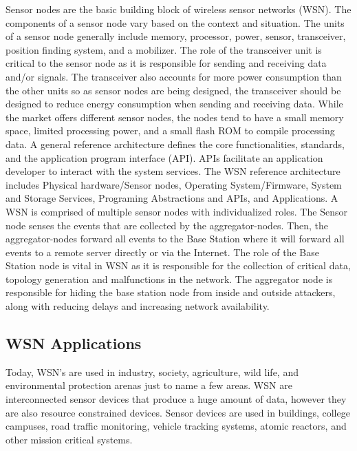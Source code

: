 Sensor nodes are the basic building block of wireless sensor networks (WSN). The components of a sensor node vary based on the context and situation. The units of a sensor node generally include memory, processor, power, sensor, transceiver, position finding system, and a mobilizer. The role of the transceiver unit is critical to the sensor node as it is responsible for sending and receiving data and/or signals. The transceiver also accounts for more power consumption than the other units so as sensor nodes are being designed, the transceiver should be designed to reduce energy consumption when sending and receiving data. While the market offers different sensor nodes, the nodes tend to have a small memory space, limited processing power, and a small flash ROM to compile processing data. A general reference architecture defines the core functionalities, standards, and the application program interface (API). APIs facilitate an application developer to interact with the system services. The WSN reference architecture includes Physical hardware/Sensor nodes, Operating System/Firmware, System and Storage Services, Programing Abstractions and APIs, and Applications. A WSN is comprised of multiple sensor nodes with individualized roles. The Sensor node senses the events that are collected by the aggregator-nodes. Then, the aggregator-nodes forward all events to the Base Station where it will forward all events to a remote server directly or via the Internet. The role of the Base Station node is vital in WSN as it is responsible for the collection of critical data, topology generation and malfunctions in the network. The aggregator node is responsible for hiding the base station node from inside and outside attackers, along with reducing delays and increasing network availability. 

\subsection {WSN Applications} 

Today, WSN’s are used in industry, society, agriculture, wild life, and environmental protection arenas just to name a few areas. WSN are interconnected sensor devices that produce a huge amount of data, however they are also resource constrained devices. Sensor devices are used in buildings, college campuses, road traffic monitoring, vehicle tracking systems, atomic reactors, and other mission critical systems. 

\smallskip


